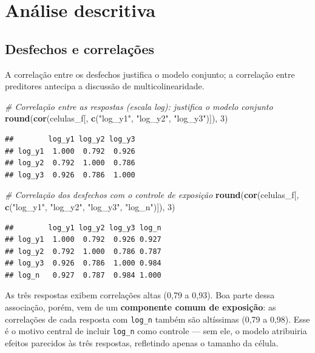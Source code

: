 \documentclass[
  11pt,
]{article}
\newenvironment{Shaded}{\begin{snugshade}}{\end{snugshade}}
\newcommand{\CommentTok}[1]{\textcolor[rgb]{0.56,0.35,0.01}{\textit{#1}}}
\newcommand{\DecValTok}[1]{\textcolor[rgb]{0.00,0.00,0.81}{#1}}
\newcommand{\FunctionTok}[1]{\textcolor[rgb]{0.13,0.29,0.53}{\textbf{#1}}}
\newcommand{\NormalTok}[1]{#1}
\newcommand{\StringTok}[1]{\textcolor[rgb]{0.31,0.60,0.02}{#1}}
\begin{document}
\newpage

\section{Análise descritiva}\label{anuxe1lise-descritiva}

\subsection{Desfechos e
correlações}\label{desfechos-e-correlauxe7uxf5es}

A correlação entre os desfechos justifica o modelo conjunto; a
correlação entre preditores antecipa a discussão de multicolinearidade.

\begin{Shaded}
\begin{Highlighting}[]
\CommentTok{\# Correlação entre as respostas (escala log): justifica o modelo conjunto}
\FunctionTok{round}\NormalTok{(}\FunctionTok{cor}\NormalTok{(celulas\_f[, }\FunctionTok{c}\NormalTok{(}\StringTok{"log\_y1"}\NormalTok{, }\StringTok{"log\_y2"}\NormalTok{, }\StringTok{"log\_y3"}\NormalTok{)]), }\DecValTok{3}\NormalTok{)}
\end{Highlighting}
\end{Shaded}

\begin{verbatim}
##        log_y1 log_y2 log_y3
## log_y1  1.000  0.792  0.926
## log_y2  0.792  1.000  0.786
## log_y3  0.926  0.786  1.000
\end{verbatim}

\begin{Shaded}
\begin{Highlighting}[]
\CommentTok{\# Correlação dos desfechos com o controle de exposição}
\FunctionTok{round}\NormalTok{(}\FunctionTok{cor}\NormalTok{(celulas\_f[, }\FunctionTok{c}\NormalTok{(}\StringTok{"log\_y1"}\NormalTok{, }\StringTok{"log\_y2"}\NormalTok{, }\StringTok{"log\_y3"}\NormalTok{, }\StringTok{"log\_n"}\NormalTok{)]), }\DecValTok{3}\NormalTok{)}
\end{Highlighting}
\end{Shaded}

\begin{verbatim}
##        log_y1 log_y2 log_y3 log_n
## log_y1  1.000  0.792  0.926 0.927
## log_y2  0.792  1.000  0.786 0.787
## log_y3  0.926  0.786  1.000 0.984
## log_n   0.927  0.787  0.984 1.000
\end{verbatim}

As três respostas exibem correlações altas (0,79 a 0,93). Boa parte
dessa associação, porém, vem de um \textbf{componente comum de
exposição}: as correlações de cada resposta com \texttt{log\_n} também
são altíssimas (0,79 a 0,98). Esse é o motivo central de incluir
\texttt{log\_n} como controle --- sem ele, o modelo atribuiria efeitos
parecidos às três respostas, refletindo apenas o tamanho da célula.
\end{document}
